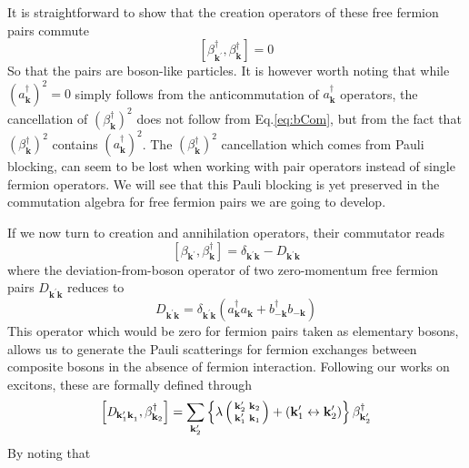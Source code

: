 \documentclass[aps,prb,superscriptaddress,showpacs,reprint,lengthcheck]{revtex4-1}
\newcommand{\vk}{\ensuremath{\mathbf{k}}}
\begin{document}
It is straightforward to show that the creation operators of these free fermion pairs commute 
\begin{equation}  \label{eq:bCom}
\left[\beta^{\dagger}_{\mathbf{k} ^{\prime}},\beta^{\dagger}_{\mathbf{k} }%
\right]  =0
\end{equation}
So that the pairs are boson-like  particles.  It is however worth noting that while ${(a^{\dagger}_{\mathbf{k}})} ^2=0$
simply follows from the anticommutation of $a^{\dagger}_{\mathbf{k} }$
operators, the cancellation of ${(\beta^{\dagger}_{\mathbf{k}})} ^2$ does not follow from Eq.\eqref{eq:bCom}, but from the fact that ${(\beta^{\dagger}_{\mathbf{k}})} ^2$  contains ${(a^{\dagger}_{\mathbf{k}})} ^2$. The ${(\beta^{\dagger}_{\mathbf{k}})} ^2$  cancellation which comes from Pauli blocking, can seem to be lost
when working with pair operators instead of  single fermion operators. We will see that this Pauli blocking is yet preserved in the commutation algebra for
free fermion pairs we are going to develop.

If we now turn to creation and annihilation operators, their commutator reads
\begin{equation}  \label{eq:betacom}
\left[\beta_{\mathbf{k} ^{\prime}},\beta^{\dagger}_{\mathbf{k} }\right] 
=\delta_{\mathbf{k} ^{\prime}\mathbf{k} }-\mathit{D} _{\mathbf{k} ^{\prime}%
\mathbf{k} }
\end{equation}
where the deviation-from-boson operator of two zero-momentum free fermion pairs $\mathit{D} _{\mathbf{k} ^{\prime}\mathbf{k%
} }$ reduces to 
\begin{equation}  \label{eq:D}
\mathit{D} _{\mathbf{k} ^{\prime}\mathbf{k} }=\delta_{\mathbf{k} ^{\prime}%
\mathbf{k} }\left(a^{\dagger}_{\mathbf{k}}a^{}_{\mathbf{k}
}+b^{\dagger}_{-\mathbf{k} }b^{}_{-\mathbf{k}
}\right) 
\end{equation}
This operator which would be  zero for fermion pairs  taken as
elementary bosons, allows us to generate the Pauli scatterings for fermion
exchanges between composite bosons in the absence of fermion interaction. Following our works on excitons\cite%
{CobosonPhysicsReports}, these are formally defined through 
\begin{equation}\label{eq:dbeta}
\left[\mathit{D} _{\mathbf{k} ^{\prime}_1\mathbf{k} ^{}_1},\beta^{\dagger}_{%
\mathbf{k} _2}\right]  =\sum_{\mathbf{k} ^{\prime}_2}\left\{\lambda\left(%
\begin{smallmatrix}\vk'_2&\vk_2\\\vk'_1&\vk_1\end{smallmatrix}\right) 
+\left(\mathbf{k} ^{\prime}_1\leftrightarrow\mathbf{k} ^{\prime}_2\right)
\right\} \beta^{\dagger}_{\mathbf{k} ^{\prime}_2}
\end{equation}
By noting that
\end{document}
